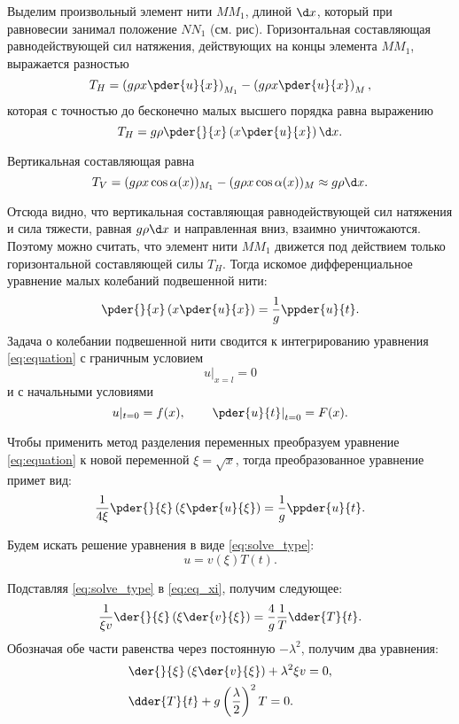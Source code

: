 Выделим произвольный элемент нити \( MM_1 \), длиной \( \d x \), который при
равновесии занимал положение \( NN_1 \) (см. рис). Горизонтальная составляющая
равнодействующей сил натяжения, действующих на концы элемента \( MM_1 \),
выражается разностью
\[
    T_H = \left(g\rho x\pder{u}{x}\right)_{M_1} - \left(g\rho x\pder{u}{x}\right)_M,
\]
которая с точностью до бесконечно малых высшего порядка равна выражению
\[
    T_H = g\rho\pder{}{x}\left(x\pder{u}{x}\right)\d x.
\]

Вертикальная составляющая равна
\[
    T_V = (g\rho x\cos\alpha(x))_{M_1} - (g\rho x\cos\alpha(x))_M \approx g\rho\d x.
\]

Отсюда видно, что вертикальная составляющая равнодействующей сил натяжения
и сила тяжести, равная \( g\rho\d x \) и направленная вниз, взаимно уничтожаются.
Поэтому можно считать, что элемент нити \( MM_1 \) движется под действием
только горизонтальной составляющей силы \( T_H \). Тогда
искомое дифференциальное уравнение малых колебаний подвешенной нити:
\begin{equation}
    \pder{}{x}\left(x\pder{u}{x}\right) = \frac{1}{g}\ppder{u}{t}.
    \label{eq:equation}
\end{equation}
Задача о колебании подвешенной нити сводится к интегрированию уравнения
\eqref{eq:equation} с граничным условием
\begin{equation}
    u|_{x = l} = 0
    \label{condition_corner}
\end{equation}
и с начальными условиями
\begin{equation}
    u|_{t = 0} = f(x), \hspace{2em} \left.\pder{u}{t}\right|_{t = 0} = F(x).
    \label{condition_zero}
\end{equation}

Чтобы применить метод разделения переменных преобразуем уравнение
\eqref{eq:equation} к новой переменной \( \xi = \sqrt{x} \), тогда преобразованное
уравнение примет вид:
\begin{equation}
    \frac{1}{4\xi}\pder{}{\xi}\left(\xi\pder{u}{\xi}\right) = \frac{1}{g}\ppder{u}{t}.
    \label{eq:eq_xi}
\end{equation}

Будем искать решение уравнения в виде \eqref{eq:solve_type}:
\begin{equation}
    u = v(\xi)T(t).
    \label{eq:solve_type}
\end{equation}

Подставляя \eqref{eq:solve_type} в \eqref{eq:eq_xi}, получим следующее:
\[
    \frac{1}{\xi v}\der{}{\xi}\left(\xi\der{v}{\xi}\right) = \frac{4}{g}\frac{1}{T}\dder{T}{t}.
\]
Обозначая обе части равенства через постоянную \( -\lambda^2 \), получим два
уравнения:
\begin{align}
    & \der{}{\xi}\left(\xi\der{v}{\xi}\right) + \lambda^2\xi v = 0, \label{eq:v_xi} \\
    & \dder{T}{t} + g\left(\frac{\lambda}{2}\right)^2T = 0. \label{eq:T_t}
\end{align}

